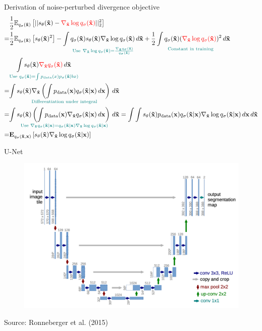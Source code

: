 \documentclass[aspectratio=169,xcolor=dvipsnames]{beamer}
\newcommand{\bx}{\mathbf{x}}
\newcommand{\btx}{\mathbf{\tilde{x}}}
\newcommand{\nbtx}{\nabla_{\btx}}
\begin{document}
\begin{frame}{Derivation of noise-perturbed divergence objective}
  \small
  \begin{align*}
    &\frac{1}{2} \mathbb{E}_{q_\sigma(\btx)} \left[ || s_\theta(\btx) - \textcolor{red}{\nbtx \log q_\sigma (\btx)} ||_2^2 \right]\\
    =&\frac{1}{2} \mathbb{E}_{q_\sigma(\btx)} \left[ s_\theta(\btx)^2 \right] - \underset{\textcolor{teal}{\text{Use}~\nbtx \log q_\sigma (\btx) = \frac{\nbtx q_\sigma(\btx)}{q_\sigma(\btx)} }}{ \int q_{\sigma}(\btx) s_\theta(\btx) \nbtx \log q_\sigma(\btx)  \,d \btx} + \underset{\textcolor{teal}{\text{Constant in training}}}{\frac{1}{2} \int q_\sigma (\btx) (\textcolor{red}{\nbtx \log q_\sigma(\btx)})^2 \,d\btx}\\
    &\underset{\textcolor{teal}{\text{Use } q_\sigma(\btx) = \int p_\text{data}(x) p_\sigma(\btx | bx)} }{ \int s_\theta(\btx) \textcolor{red}{\nbtx q_\sigma(\btx)}  \,d \btx}\\
    = &\underset{\text{\textcolor{teal}{Differentiation under integral}}}{\int s_\theta(\btx) \nbtx \left( \int p_\text{data} (\bx) q_\sigma(\btx | \bx) \,d \bx \right) \, d \btx}  \\
    =& \underset{\textcolor{teal}{\text{Use } \nbtx q_\sigma(\btx | \bx) = q_\sigma (\btx | \bx) \nbtx \log q_\sigma(\btx | \bx)}}{\int s_\theta(\btx) \left( \int p_\text{data}(\bx) \nbtx q_\sigma(\btx | \bx) \,d \bx \right) \,d \btx } = \int \int s_\theta(\btx)  p_\text{data}(\bx) q_\sigma (\btx | \bx) \nbtx \log q_\sigma(\btx | \bx) \,d \bx \,d \btx \\
    =& \mathbf{E}_{q_\sigma(\btx, \bx)} \left[ s_\theta(\btx) \nbtx \log q_\sigma(\btx | \bx) \right]
  \end{align*}
\end{frame}



\begin{frame}{U-Net}
  \centering
  \begin{figure}
    \includegraphics[height=0.65\textheight]{figs/unet-Ronneberger2015.png}
  \end{figure}
  \tiny{
        Source: Ronneberger et al. (2015)
  }
\end{frame}
\end{document}
